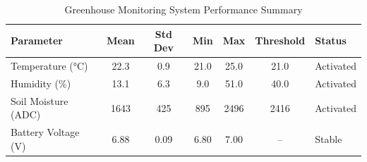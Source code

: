 
\begin{table}[h]
\centering
\caption{Greenhouse Monitoring System Performance Summary}
\label{tab:performance}
\begin{tabular}{lcccccl}
\hline
\textbf{Parameter} & \textbf{Mean} & \textbf{Std Dev} & \textbf{Min} & \textbf{Max} & \textbf{Threshold} & \textbf{Status} \\
\hline
Temperature (°C) & 22.3 & 0.9 & 21.0 & 25.0 & 21.0 & Activated \\
Humidity (\%) & 13.1 & 6.3 & 9.0 & 51.0 & 40.0 & Activated \\
Soil Moisture (ADC) & 1643 & 425 & 895 & 2496 & 2416 & Activated \\
Battery Voltage (V) & 6.88 & 0.09 & 6.80 & 7.00 & -- & Stable \\
\hline
\end{tabular}
\end{table}
